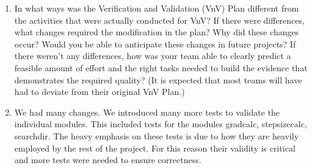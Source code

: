 \documentclass[12pt, titlepage]{article}
\begin{document}
\begin{enumerate}
  \item In what ways was the Verification and Validation (VnV) Plan different
  from the activities that were actually conducted for VnV?  If there were
  differences, what changes required the modification in the plan?  Why did
  these changes occur?  Would you be able to anticipate these changes in future
  projects?  If there weren't any differences, how was your team able to clearly
  predict a feasible amount of effort and the right tasks needed to build the
  evidence that demonstrates the required quality?  (It is expected that most
  teams will have had to deviate from their original VnV Plan.)
  \item We had many changes. We introduced many more tests to validate the individual modules. This included tests for the modules gradcalc, stepsizecalc, searchdir. The heavy emphasis on these tests is due to how they are heavily employed by the rest of the project. For this reason their validity is critical and more tests were needed to ensure correctness. 
\end{enumerate}
\end{document}
